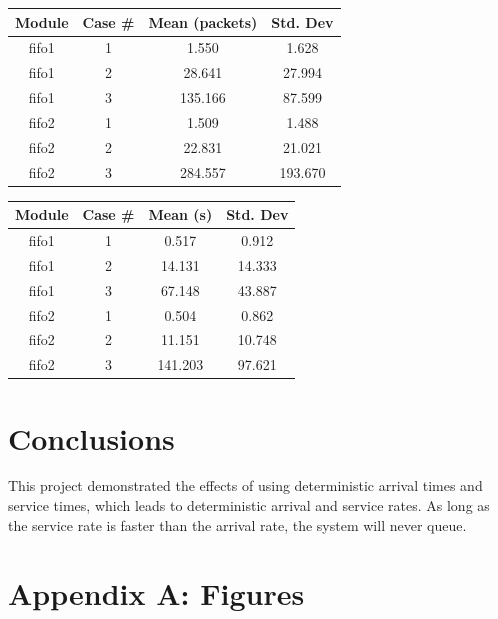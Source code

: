 \documentclass{article}
\begin{document}
\begin{minipage}{0.5\textwidth}
	\centering
	\begin{tabular}{|c|c|c|c|} \hline
		\textbf{Module} & \textbf{Case \#} & \textbf{Mean (packets)} & \textbf{Std. Dev} \\ \hline
	 fifo1 & 1 & 1.550 & 1.628 \\ \hline
	 fifo1 & 2 & 28.641 & 27.994 \\ \hline
	 fifo1 & 3 & 135.166 & 87.599 \\ \hline
	 fifo2 & 1 & 1.509 & 1.488 \\ \hline
	 fifo2 & 2 & 22.831 & 21.021 \\ \hline
	 fifo2 & 3 & 284.557 & 193.670 \\ \hline
	\end{tabular}
	\label{qlen}
\end{minipage}  
\begin{minipage}{0.5\textwidth}
	\centering
	\begin{tabular}{|c|c|c|c|} \hline
		\textbf{Module} & \textbf{Case \#} & \textbf{Mean (s)} & \textbf{Std. Dev} \\ \hline
		fifo1 & 1 & 0.517 & 0.912 \\ \hline
		fifo1 & 2 & 14.131 & 14.333 \\ \hline
		fifo1 & 3 & 67.148 & 43.887 \\ \hline
		fifo2 & 1 & 0.504 & 0.862 \\ \hline
		fifo2 & 2 & 11.151 & 10.748 \\ \hline
		fifo2 & 3 & 141.203 & 97.621 \\ \hline
	\end{tabular}
	\label{qTime}
\end{minipage}

\section*{Conclusions}
This project demonstrated the effects of using deterministic arrival times and service times, which leads to deterministic arrival and service rates.
As long as the service rate is faster than the arrival rate, the system will never queue.

\newpage
\section*{Appendix A:  Figures}
\end{document}
